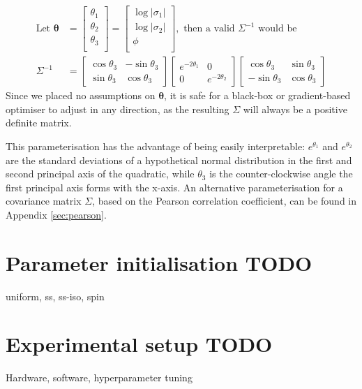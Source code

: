 \documentclass[a4paper, 12pt]{report}
\def\comment#1{\color{red}#1\color{black}}
\begin{document}
\begin{align}
\textrm{Let }\boldsymbol{\theta}&=\begin{bmatrix}
	\theta_1\\
	\theta_2\\
	\theta_3\\
\end{bmatrix}=\begin{bmatrix}
	\log|\sigma_1| \\
	\log|\sigma_2|\\
	\phi\\
\end{bmatrix}, \textrm{ then a valid $\Sigma^{-1}$ would be} \\
\Sigma^{-1} &= \begin{bmatrix}
	\cos \theta_3 & -\sin \theta_3 \\ \sin\theta_3 & \cos\theta_3
\end{bmatrix}\begin{bmatrix}
	 e^{-2\theta_1} & 0\\ 0 &  e^{-2\theta_2}
\end{bmatrix} \begin{bmatrix}
	\cos \theta_3 & \sin \theta_3 \\ -\sin\theta_3 & \cos\theta_3
\end{bmatrix}
\end{align}
Since we placed no assumptions on $\boldsymbol{\theta}$, it is safe for a black-box or gradient-based optimiser to adjust in any direction, as the resulting $\Sigma$ will always be a positive definite matrix.

This parameterisation has the advantage of being easily interpretable: $e^{\theta_1}$ and $e^{\theta_2}$ are the standard deviations of a hypothetical normal distribution in the first and second principal axis of the quadratic, while $\theta_3$ is the counter-clockwise angle the first principal axis forms with the x-axis. An alternative parameterisation for a covariance matrix $\Sigma$, based on the Pearson correlation coefficient, can be found in Appendix \ref{sec:pearson}.




\newpage
\section{Parameter initialisation \comment{TODO}}
\comment{uniform, ss, ss-iso, spin}

\newpage
\section{Experimental setup \comment{TODO}}
\comment{Hardware, software, hyperparameter tuning}
\end{document}
